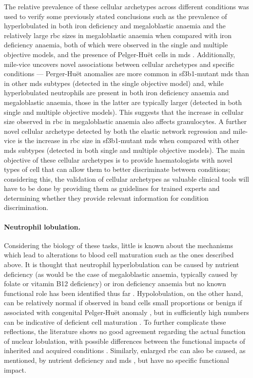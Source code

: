 The relative prevalence of these cellular archetypes across different conditions was used to verify some previously stated conclusions such as the prevalence of hyperlobulated in both iron deficiency and megaloblastic anaemia \cite{Lindenbaum1980-ux,Westerman1999-gs} and the relatively large \ac{rbc} sizes in megaloblastic anaemia when compared with iron deficiency anaemia, both of which were observed in the single and multiple objective models, and the presence of Pelger-Huët cells in \ac{mds} \cite{Colella2012-so}. Additionally, \ac{mile-vice} uncovers novel associations between cellular archetypes and specific conditions --- Perger-Huët anomalies are more common in \ac{sf3b1}-mutant \ac{mds} than in other \ac{mds} subtypes (detected in the single objective model) and, while hyperlobulated neutrophils are present in both iron deficiency anaemia and megaloblastic anaemia, those in the latter are typically larger (detected in both single and multiple objective models). This suggests that the increase in cellular size observed in \ac{rbc} in megaloblastic anaemia also affects granulocytes. A further novel cellular archetype detected by both the elastic network regression and \ac{mile-vice} is the increase in \ac{rbc} size in \ac{sf3b1}-mutant \ac{mds} when compared with other \ac{mds} subtypes (detected in both single and multiple objective models). The main objective of these cellular archetypes is to provide haematologists with novel types of cell that can allow them to better discriminate between conditions; considering this, the validation of cellular archetypes as valuable clinical tools will have to be done by providing them as guidelines for trained experts and determining whether they provide relevant information for condition discrimination.

\paragraph{Neutrophil lobulation.} Considering the biology of these tasks, little is known about the mechanisms which lead to alterations to blood cell maturation such as the ones described above. It is thought that neutrophil hyperlobulation can be caused by nutrient deficiency (as would be the case of megaloblastic anaemia, typically caused by folate or vitamin B12 deficiency) or iron deficiency anaemia but no known functional role has been identified thus far \cite{Manley2018-xo}. Hypolobulation, on the other hand, can be relatively normal if observed in band cells small proportions or benign if associated with congenital Pelger-Huët anomaly \cite{Colella2012-so}, but in sufficiently high numbers can be indicative of deficient cell maturation \cite{Aster2020-cu}. To further complicate these reflections, the literature shows no good agreement regarding the actual function of nuclear lobulation, with possible differences between the functional impacts of inherited and acquired conditions \cite{Manley2018-xo}. Similarly, enlarged \ac{rbc} can also be caused, as mentioned, by nutrient deficiency and \ac{mds} \cite{Aslinia2006-en}, but have no specific functional impact. 

